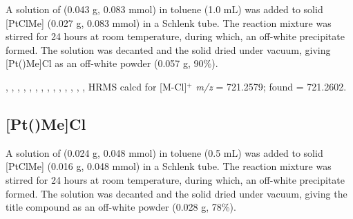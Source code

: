 
A solution of \tButhixantphos{} (0.043 g, 0.083 mmol) in toluene (1.0 mL) was added to solid [PtClMe] (0.027 g, 0.083 mmol) in a Schlenk tube.  The reaction mixture was stirred for 24 hours at room temperature, during which, an off-white precipitate formed.  The solution was decanted and the   solid dried under vacuum, giving [Pt(\tButhixantphos)Me]Cl as an off-white powder (0.057 g, 90\%).

,
,
,
,
,
,
,
,
,
,
,
,
,
,
HRMS calcd for  [M-Cl]$^+$ \emph{m/z} = 721.2579; found = 721.2602.


\subsection*{[Pt(\tBuxantphos)Me]Cl}
%

A solution of \tBuxantphos{} (0.024 g, 0.048 mmol) in toluene (0.5 mL) was added to solid [PtClMe] (0.016 g, 0.048 mmol) in a Schlenk tube.  The reaction mixture was stirred for 24 hours at room temperature, during which, an off-white precipitate formed.  The solution was decanted and the   solid dried under vacuum, giving the title compound as an off-white powder (0.028 g, 78\%).

